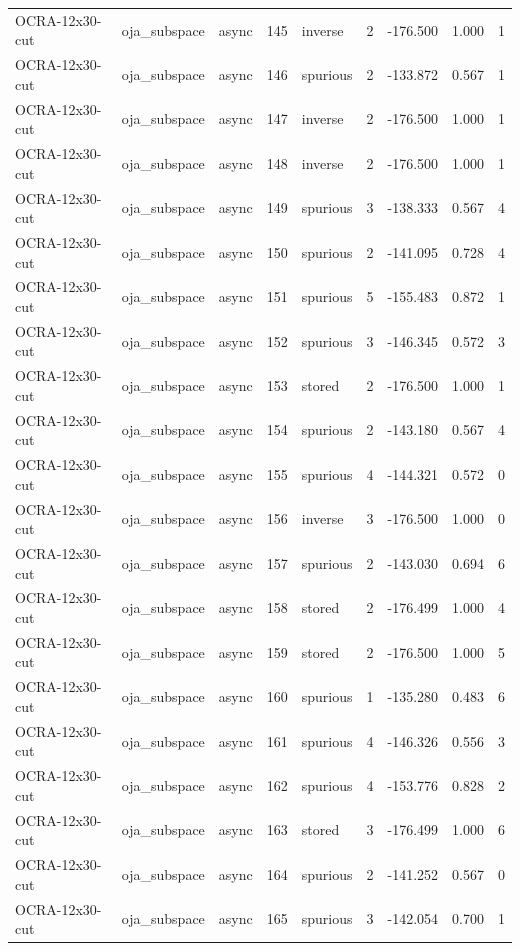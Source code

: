\begin{tabular}{lllrlrrrr}
OCRA-12x30-cut & oja\_subspace & async & 145 & inverse & 2 & -176.500 & 1.000 & 1 \\
OCRA-12x30-cut & oja\_subspace & async & 146 & spurious & 2 & -133.872 & 0.567 & 1 \\
OCRA-12x30-cut & oja\_subspace & async & 147 & inverse & 2 & -176.500 & 1.000 & 1 \\
OCRA-12x30-cut & oja\_subspace & async & 148 & inverse & 2 & -176.500 & 1.000 & 1 \\
OCRA-12x30-cut & oja\_subspace & async & 149 & spurious & 3 & -138.333 & 0.567 & 4 \\
OCRA-12x30-cut & oja\_subspace & async & 150 & spurious & 2 & -141.095 & 0.728 & 4 \\
OCRA-12x30-cut & oja\_subspace & async & 151 & spurious & 5 & -155.483 & 0.872 & 1 \\
OCRA-12x30-cut & oja\_subspace & async & 152 & spurious & 3 & -146.345 & 0.572 & 3 \\
OCRA-12x30-cut & oja\_subspace & async & 153 & stored & 2 & -176.500 & 1.000 & 1 \\
OCRA-12x30-cut & oja\_subspace & async & 154 & spurious & 2 & -143.180 & 0.567 & 4 \\
OCRA-12x30-cut & oja\_subspace & async & 155 & spurious & 4 & -144.321 & 0.572 & 0 \\
OCRA-12x30-cut & oja\_subspace & async & 156 & inverse & 3 & -176.500 & 1.000 & 0 \\
OCRA-12x30-cut & oja\_subspace & async & 157 & spurious & 2 & -143.030 & 0.694 & 6 \\
OCRA-12x30-cut & oja\_subspace & async & 158 & stored & 2 & -176.499 & 1.000 & 4 \\
OCRA-12x30-cut & oja\_subspace & async & 159 & stored & 2 & -176.500 & 1.000 & 5 \\
OCRA-12x30-cut & oja\_subspace & async & 160 & spurious & 1 & -135.280 & 0.483 & 6 \\
OCRA-12x30-cut & oja\_subspace & async & 161 & spurious & 4 & -146.326 & 0.556 & 3 \\
OCRA-12x30-cut & oja\_subspace & async & 162 & spurious & 4 & -153.776 & 0.828 & 2 \\
OCRA-12x30-cut & oja\_subspace & async & 163 & stored & 3 & -176.499 & 1.000 & 6 \\
OCRA-12x30-cut & oja\_subspace & async & 164 & spurious & 2 & -141.252 & 0.567 & 0 \\
OCRA-12x30-cut & oja\_subspace & async & 165 & spurious & 3 & -142.054 & 0.700 & 1 \\

\end{tabular}
